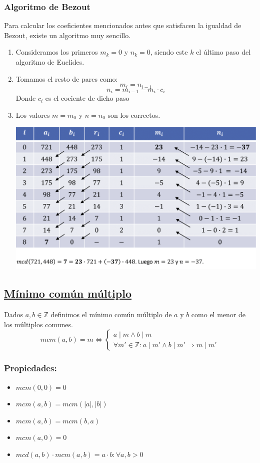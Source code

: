 \documentclass[10pt,a4paper,openright]{book}
\begin{document}
\subsubsection*{Algoritmo de Bezout}
Para calcular los coeficientes mencionados antes que satisfacen la igualdad de Bezout, existe un algoritmo muy sencillo.
\begin{enumerate}
\item Consideramos los primeros $m_k=0$ y $n_k=0$, siendo este $k$ el último paso del algoritmo de Euclides.

\item Tomamos el resto de pares como:
$$m_i=n_{i-1}$$
$$n_i=m_{i-1}-m_i\cdot c_i$$
Donde $c_i$ es el cociente de dicho paso

\item Los valores $m=m_0$ y $n=n_0$ son los correctos.
\begin{center}
\includegraphics[scale=0.45]{algoritmo de Bezout}
\end{center}
\end{enumerate}

\subsection*{\underline{Mínimo común múltiplo}}
Dados $a,b\in \mathbb Z$ definimos el mínimo común múltiplo de $a$ y $b$ como el menor de los múltiplos comunes.
$$mcm(a,b)=m\Leftrightarrow
\begin{cases}
a\mid m \wedge b\mid m \\
\forall m'\in \mathbb Z: a\mid m' \wedge b\mid m'\Rightarrow m\mid m'
\end{cases}
$$

\subsubsection*{Propiedades:}
\begin{itemize}
\item $mcm(0,0)=0$
\item $mcm(a,b)=mcm(|a|,|b|)$
\item $mcm(a,b)=mcm(b,a)$
\item $mcm(a,0)=0$
\item $mcd(a,b)\cdot mcm(a,b)=a\cdot b: \forall a,b>0$
\end{itemize}
\end{document}

